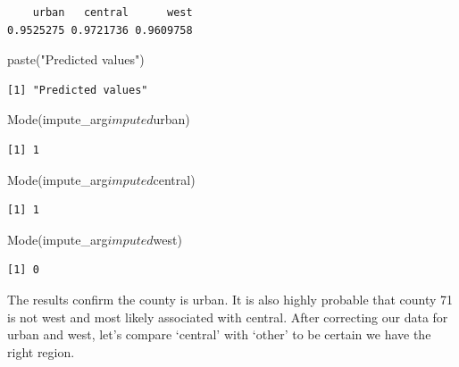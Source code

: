 \documentclass[]{article}
\newenvironment{Shaded}{}{}
\newcommand{\KeywordTok}[1]{\textcolor[rgb]{0.00,0.00,1.00}{#1}}
\newcommand{\NormalTok}[1]{#1}
\newcommand{\OperatorTok}[1]{#1}
\newcommand{\StringTok}[1]{\textcolor[rgb]{0.00,0.50,0.50}{#1}}
\begin{document}
\begin{verbatim}
    urban   central      west 
0.9525275 0.9721736 0.9609758 
\end{verbatim}

\begin{Shaded}
\begin{Highlighting}[]
\KeywordTok{paste}\NormalTok{(}\StringTok{"Predicted values"}\NormalTok{)}
\end{Highlighting}
\end{Shaded}

\begin{verbatim}
[1] "Predicted values"
\end{verbatim}

\begin{Shaded}
\begin{Highlighting}[]
\KeywordTok{Mode}\NormalTok{(impute_arg}\OperatorTok{$}\NormalTok{imputed}\OperatorTok{$}\NormalTok{urban)}
\end{Highlighting}
\end{Shaded}

\begin{verbatim}
[1] 1
\end{verbatim}

\begin{Shaded}
\begin{Highlighting}[]
\KeywordTok{Mode}\NormalTok{(impute_arg}\OperatorTok{$}\NormalTok{imputed}\OperatorTok{$}\NormalTok{central)}
\end{Highlighting}
\end{Shaded}

\begin{verbatim}
[1] 1
\end{verbatim}

\begin{Shaded}
\begin{Highlighting}[]
\KeywordTok{Mode}\NormalTok{(impute_arg}\OperatorTok{$}\NormalTok{imputed}\OperatorTok{$}\NormalTok{west)}
\end{Highlighting}
\end{Shaded}

\begin{verbatim}
[1] 0
\end{verbatim}

The results confirm the county is urban. It is also highly probable that
county 71 is not west and most likely associated with central. After
correcting our data for urban and west, let's compare `central' with
`other' to be certain we have the right region.
\end{document}
